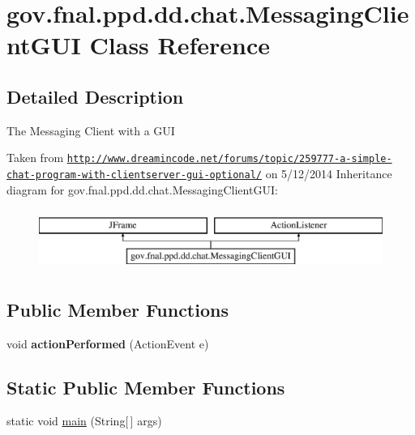 \hypertarget{classgov_1_1fnal_1_1ppd_1_1dd_1_1chat_1_1MessagingClientGUI}{\section{gov.\-fnal.\-ppd.\-dd.\-chat.\-Messaging\-Client\-G\-U\-I Class Reference}
\label{classgov_1_1fnal_1_1ppd_1_1dd_1_1chat_1_1MessagingClientGUI}
}


\subsection{Detailed Description}
The Messaging Client with a G\-U\-I

Taken from \href{http://www.dreamincode.net/forums/topic/259777-a-simple-chat-program-with-clientserver-gui-optional/}{\tt http\-://www.\-dreamincode.\-net/forums/topic/259777-\/a-\/simple-\/chat-\/program-\/with-\/clientserver-\/gui-\/optional/} on 5/12/2014 Inheritance diagram for gov.\-fnal.\-ppd.\-dd.\-chat.\-Messaging\-Client\-G\-U\-I\-:\begin{figure}[H]
\begin{center}
\leavevmode
\includegraphics[height=2.000000cm]{classgov_1_1fnal_1_1ppd_1_1dd_1_1chat_1_1MessagingClientGUI}
\end{center}
\end{figure}
\subsection*{Public Member Functions}
\begin{DoxyCompactItemize}
\item 
\hypertarget{classgov_1_1fnal_1_1ppd_1_1dd_1_1chat_1_1MessagingClientGUI_a5b1a28bbc7f3f3bcdd00cc219a4a6486}{void {\bfseries action\-Performed} (Action\-Event e)}\label{classgov_1_1fnal_1_1ppd_1_1dd_1_1chat_1_1MessagingClientGUI_a5b1a28bbc7f3f3bcdd00cc219a4a6486}

\end{DoxyCompactItemize}
\subsection*{Static Public Member Functions}
\begin{DoxyCompactItemize}
\item 
static void \hyperlink{classgov_1_1fnal_1_1ppd_1_1dd_1_1chat_1_1MessagingClientGUI_ac6a16db13da46b43cdbffbf7437f90bc}{main} (String\mbox{[}$\,$\mbox{]} args)
\end{DoxyCompactItemize}


